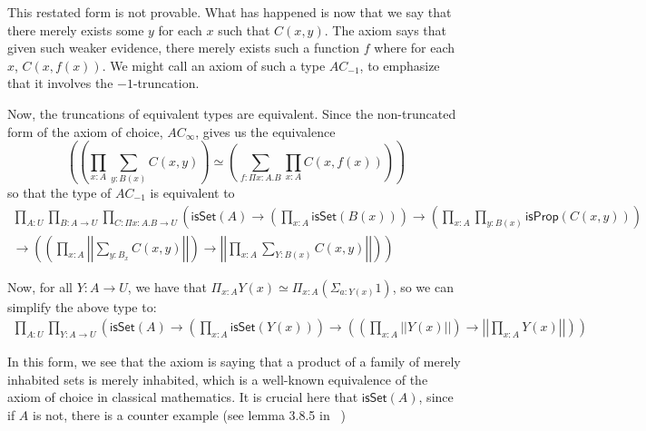 \documentclass[11pt]{article}
\newcommand*{\isSet}{\mathsf{isSet}}
\newcommand*{\isProp}{\mathsf{isProp}}
\begin{document}
This restated form is not provable. What has happened is now that we say that
there merely exists some $y$ for each $x$ such that $C(x,y)$. The axiom says
that given such weaker evidence, there merely exists such a function $f$ where
for each $x$, $C(x,f(x))$. We might call an axiom of such a type $AC_{-1}$, to
emphasize that it involves the $-1$-truncation.

Now, the truncations of equivalent types are equivalent. Since the
non-truncated form of the axiom of choice, $AC_{\infty}$, gives us the
equivalence
$$
\left(\left( \prod_{x{:}A} \sum_{y: B(x)} C(x,y) \right ) \simeq \left(\sum_{f: \Pi x{:} A. B} \prod_{x:A} C(x, f(x))\right)\right)
$$
so that the type of $AC_{-1}$ is equivalent to
\begin{multline*}
\prod_{A{:}U} \prod_{B{:}A \to U} \prod_{C{:}\Pi x:A. B \to U}
\left(\isSet(A) \to \left(\prod_{x:A} \isSet(B(x))\right) \to \left(\prod_{x:A} \prod_{y: B(x)} \isProp(C(x,y))\right) \right. \\
\left. \to \left(\left( \prod_{x{:}A} \left|\left|\sum_{y: B_x} C(x,y) \right|\right| \right ) \to 
  \left|\left| \prod_{x{:}A} \sum_{Y: B(x)} C(x,y) \right|\right| \right)\right)
\end{multline*}

Now, for all $Y: A \to U$, we have that $\Pi_{x:A} Y(x) \simeq \Pi_{x:A}(\Sigma_{a:Y(x)} 1)$, so we can simplify the above type to:
\begin{multline*}
\prod_{A{:}U} \prod_{Y{:}A \to U}
\left(\isSet(A) \to \left(\prod_{x:A} \isSet(Y(x))\right)
\to \left(\left( \prod_{x{:}A} \left|\left|Y(x) \right|\right| \right) \to 
  \left|\left| \prod_{x{:}A} Y(x) \right|\right| \right)\right)
\end{multline*}

In this form, we see that the axiom is saying that a product of a family of
merely inhabited sets is merely inhabited, which is a well-known equivalence of
the axiom of choice in classical mathematics. It is crucial here that $\isSet(A)$, 
since if $A$ is not, there is a counter example (see lemma 3.8.5 in ~\cite{HoTTBook2013})




\end{document}
